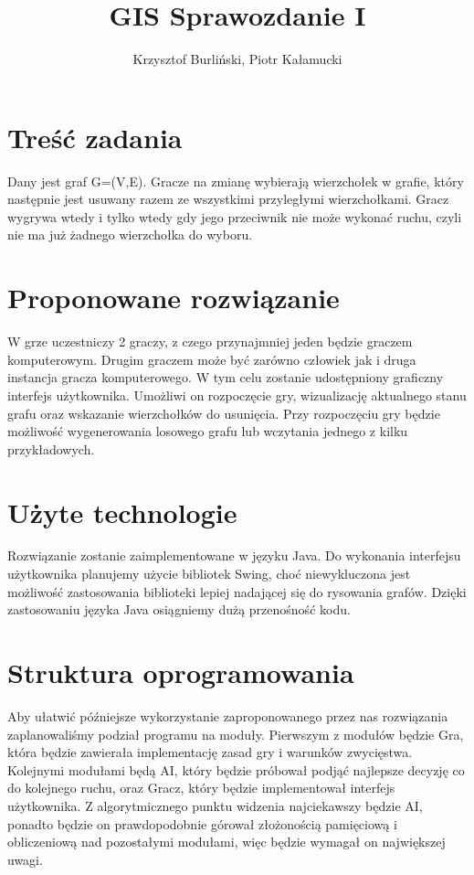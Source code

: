 \documentclass[11pt,a4paper]{article}
\title{GIS Sprawozdanie I}
\author{Krzysztof Burliński, Piotr Kałamucki}
\begin{document}
\maketitle
\section{Treść zadania}
Dany jest graf G=(V,E). Gracze na zmianę wybierają wierzchołek w grafie, który następnie jest usuwany razem ze wszystkimi przyległymi wierzchołkami. Gracz wygrywa wtedy i tylko wtedy gdy jego przeciwnik nie może wykonać ruchu, czyli nie ma już żadnego wierzchołka do wyboru.
\section{Proponowane rozwiązanie}
W grze uczestniczy 2 graczy, z czego przynajmniej jeden będzie graczem komputerowym. Drugim graczem może być zarówno człowiek jak i druga instancja gracza komputerowego. W tym celu zostanie udostępniony graficzny interfejs użytkownika. Umożliwi on rozpoczęcie gry, wizualizację aktualnego stanu grafu oraz wskazanie wierzchołków do usunięcia. Przy rozpoczęciu gry będzie możliwość wygenerowania losowego grafu lub wczytania jednego z kilku przykładowych.
\section{Użyte technologie}
Rozwiązanie zostanie zaimplementowane w języku Java. Do wykonania interfejsu użytkownika planujemy użycie bibliotek Swing, choć niewykluczona jest możliwość zastosowania biblioteki lepiej nadającej się do rysowania grafów. Dzięki zastosowaniu języka Java osiągniemy dużą przenośność kodu. 
\section{Struktura oprogramowania}
Aby ułatwić późniejsze wykorzystanie zaproponowanego przez nas rozwiązania zaplanowaliśmy podział programu na moduły. Pierwszym z modułów będzie Gra, która będzie zawierała implementację zasad gry i warunków zwycięstwa. Kolejnymi modułami będą AI, który będzie próbował podjąć najlepsze decyzję co do kolejnego ruchu, oraz Gracz, który będzie implementował interfejs użytkownika. Z algorytmicznego punktu widzenia najciekawszy będzie AI, ponadto będzie on prawdopodobnie górował złożonością pamięciową i obliczeniową nad pozostałymi modułami, więc będzie wymagał on największej uwagi. 
\end{document}
